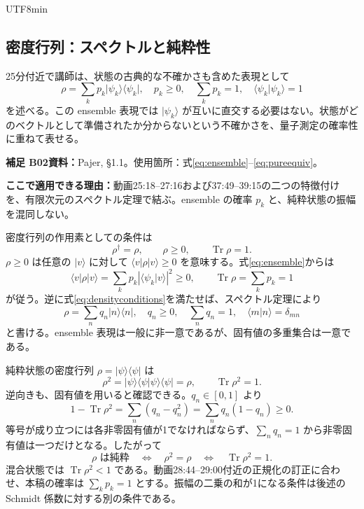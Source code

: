 \documentclass[11pt,a4paper]{article}
\numberwithin{equation}{section}
\newcommand{\Tr}{\operatorname{Tr}}
\newcommand{\ket}[1]{\lvert#1\rangle}
\newcommand{\bra}[1]{\langle#1\rvert}
\newcommand{\braket}[2]{\langle#1\vert#2\rangle}
\newcommand{\supp}[3]{\par\smallskip\noindent\textcolor{BrickRed}{\textbf{補足 #1}}\quad\textbf{資料：}#2\par\noindent\textbf{ここで適用できる理由：}#3\par}
\begin{document}
\begin{CJK*}{UTF8}{min}
\subsection{密度行列：スペクトルと純粋性}
25分付近で講師は、状態の古典的な不確かさも含めた表現として
\begin{equation}
\rho=\sum_k p_k\ket{\psi_k}\bra{\psi_k},
\quad p_k\geq0,\quad \sum_k p_k=1,
\quad \braket{\psi_k}{\psi_k}=1
\label{eq:ensemble}
\end{equation}
を述べる。この ensemble 表現では $\ket{\psi_k}$ が互いに直交する必要はない。状態がどのベクトルとして準備されたか分からないという不確かさを、量子測定の確率性に重ねて表せる。

\supp{B02}{Pajer\cite{pajer}, §1.1。使用箇所：式\eqref{eq:ensemble}--\eqref{eq:pureequiv}。}{動画25:18--27:16および37:49--39:15の二つの特徴付けを、有限次元のスペクトル定理で結ぶ。ensemble の確率 $p_k$ と、純粋状態の振幅を混同しない。}
密度行列の作用素としての条件は
\begin{equation}
\rho^\dagger=\rho,\qquad \rho\geq0,\qquad \Tr\rho=1.
\label{eq:densityconditions}
\end{equation}
$\rho\geq0$ は任意の $\ket{v}$ に対して $\bra{v}\rho\ket{v}\geq0$ を意味する。式\eqref{eq:ensemble}からは
\begin{equation}
\bra{v}\rho\ket{v}=\sum_kp_k|\braket{\psi_k}{v}|^2\geq0,
\qquad \Tr\rho=\sum_kp_k=1
\end{equation}
が従う。逆に式\eqref{eq:densityconditions}を満たせば、スペクトル定理により
\begin{equation}
\rho=\sum_nq_n\ket{n}\bra{n},
\quad q_n\geq0,\quad\sum_nq_n=1,
\quad\braket{m}{n}=\delta_{mn}
\label{eq:spectral}
\end{equation}
と書ける。ensemble 表現は一般に非一意であるが、固有値の多重集合は一意である。

純粋状態の密度行列 $\rho=\ket{\psi}\bra{\psi}$ は
\begin{equation}
\rho^2=\ket{\psi}\braket{\psi}{\psi}\bra{\psi}=\rho,
\qquad \Tr\rho^2=1.
\end{equation}
逆向きも、固有値を用いると確認できる。$q_n\in[0,1]$ より
\begin{equation}
1-\Tr\rho^2=\sum_n(q_n-q_n^2)
=\sum_nq_n(1-q_n)\geq0.
\end{equation}
等号が成り立つには各非零固有値が1でなければならず、$\sum_nq_n=1$ から非零固有値は一つだけとなる。したがって
\begin{equation}
\rho\text{ は純粋}\quad\Longleftrightarrow\quad
\rho^2=\rho\quad\Longleftrightarrow\quad\Tr\rho^2=1.
\label{eq:pureequiv}
\end{equation}
混合状態では $\Tr\rho^2<1$ である。動画28:44--29:00付近の正規化の訂正に合わせ、本稿の確率は $\sum_kp_k=1$ とする。振幅の二乗の和が1になる条件は後述の Schmidt 係数に対する別の条件である。


\end{CJK*}
\end{document}
